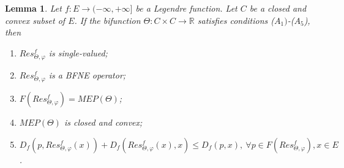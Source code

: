 \documentclass[reqno,b5paper]{amsart}
\theoremstyle{plain}
\newtheorem{lemma}[theorem]{Lemma}
\theoremstyle{definition}
\numberwithin{equation}{section}
\numberwithin{equation}{section}
\begin{document}
\begin{lemma}\label{nv}
Let $f:E\to(-\infty,+\infty]$ be a Legendre function. Let $C$ be a closed and convex subset of $E$. If the bifunction $\Theta: C\times C\to\mathbb{R}$ satisfies conditions ($A_{1})$-($A_{5}$), then 
\begin{enumerate}

\item $Res_{\Theta,\varphi}^{f}$ is single-valued;

\item $Res_{\Theta,\varphi}^{f}$ is a BFNE operator;

\item $F\left(Res_{\Theta,\varphi}^{f}\right)=MEP(\Theta)$;

\item $MEP(\Theta)$ is closed and convex;

\item $D_{f}\left(p, Res_{\Theta,\varphi}^{f}(x)\right)+D_{f}\left(Res_{\Theta,\varphi}^{f}(x),x\right)\leq D_{f}(p,x), \ \forall p\in F\left(Res_{\Theta,\varphi}^{f}\right), x\in E$.
\end{enumerate}
\end{lemma}
\end{document}

